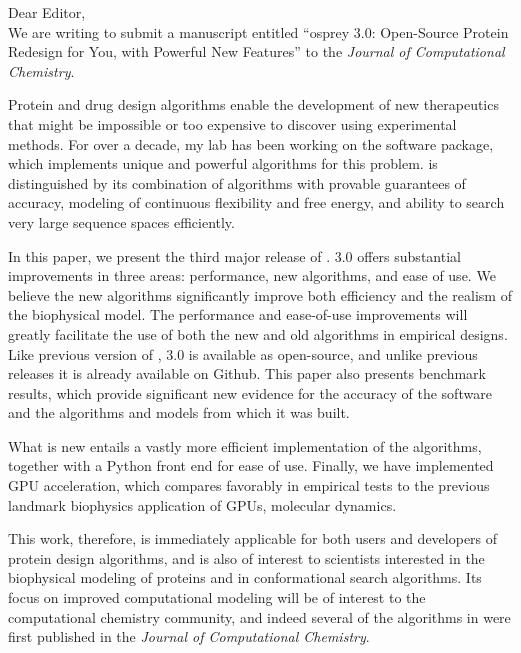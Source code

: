 \documentclass[11pt, oneside]{article}   	%
\def\osprey{{\sc{osprey}}\xspace}
\begin{document}


Dear Editor, 
\\

We are writing to submit a manuscript entitled ``{\sc osprey} 3.0: Open-Source Protein Redesign for You, with Powerful New Features'' to the {\em Journal of Computational Chemistry}.  

Protein and drug design algorithms enable the development of new therapeutics that might be impossible or too expensive to discover using experimental methods.  For over a decade, my lab has been working on the \osprey software package, which implements unique and powerful algorithms for this problem.  \osprey is distinguished by its combination of algorithms with provable guarantees of accuracy, modeling of continuous flexibility and free energy, and ability to search very large sequence spaces efficiently.  

In this paper, we present the third major release of \osprey.  \osprey 3.0 offers substantial improvements in three areas: performance, new algorithms, and ease of use.  We believe the new algorithms significantly improve both efficiency and the realism of the biophysical model.  The performance and ease-of-use improvements will greatly facilitate the use of both the new and old algorithms in empirical designs.  Like previous version of \osprey, \osprey 3.0 is available as open-source, and unlike previous releases it is already available on Github.  This paper also presents benchmark results, which provide significant new evidence for the accuracy of the software and the algorithms and models from which it was built.  

What is new entails a vastly more efficient implementation of the algorithms, together with a Python front end for ease of use.  Finally, we have implemented GPU acceleration, which compares favorably in empirical tests to the previous landmark biophysics application of GPUs, molecular dynamics.  

This work, therefore, is immediately applicable for both users and developers of protein design algorithms, and is also of interest to scientists interested in the biophysical modeling of proteins and in conformational search algorithms.  Its focus on improved computational modeling will be of interest to the computational chemistry community, and indeed several of the algorithms in \osprey were first published in the {\em Journal of Computational Chemistry}.  
\end{document}
